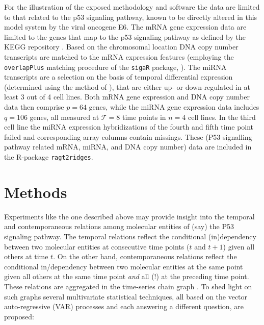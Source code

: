 For the illustration of the exposed methodology and software the data are limited to that related to the p53 signaling pathway, known to be directly altered in this model system by the viral oncogene E6. The mRNA gene expression data are limited to the genes that map to the p53 signaling pathway as defined by the KEGG repository \citep{Kanehisa2000}. Based on the chromosomal location DNA copy number transcripts are matched to the mRNA expression features (employing the {\tt overlapPlus} matching procedure of the \texttt{sigaR} package, \citealp{Wieringen2012}). The miRNA transcripts are a selection on the basis of temporal differential expression (determined using the method of \citealp{Miok2014}), that are either up- or down-regulated in at least 3 out of 4 cell lines. Both mRNA gene expression and DNA copy number data then comprise $p=64$ genes, while the miRNA gene expression data  includes $q=106$ genes, all measured at $\mathcal{T}=8$ time points in $n=4$ cell lines. In the third cell line the miRNA expression hybridizations of the fourth and fifth time point failed and corresponding array columns contain missings. These (P53 signalling pathway related mRNA, miRNA, and DNA copy number) data are included in the R-package {\tt ragt2ridges}. 

\section{Methods}
Experiments like the one described above may provide insight into the temporal and contemporaneous relations among molecular entities of (say) the P53 signaling pathway. The temporal relations reflect the conditional (in)dependency between two molecular entities at consecutive time points ($t$ and $t+1$) given all others at time $t$. On the other hand, contemporaneous relations reflect the conditional in/dependency between two molecular entities at the same point given all others at the same time point \textit{and} all (!) at the preceding time point. These relations are aggregated in the time-series chain graph \citep{Dahlhaus2000}. To shed light on such graphs several multivariate statistical techniques, all based on the vector auto-regressive (VAR) processes and each answering a different question, are proposed:

